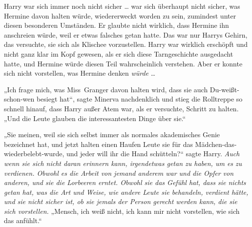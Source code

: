 Harry war sich immer noch nicht sicher … war sich überhaupt nicht sicher, was Hermine davon halten würde, wiedererweckt worden zu sein, zumindest unter diesen besonderen Umständen. Er glaubte nicht wirklich, dass Hermine ihn anschreien würde, weil er etwas falsches getan hatte. Das war nur Harrys Gehirn, das versuchte, sie sich als Klischee vorzustellen. Harry war wirklich erschöpft und nicht ganz klar im Kopf gewesen, als er sich diese Tarngeschichte ausgedacht hatte, und Hermine würde diesen Teil wahrscheinlich verstehen. Aber er konnte sich nicht vorstellen, was Hermine denken \emph{würde} …

„Ich frage mich, was Miss~Granger davon halten wird, dass sie auch Du-weißt-schon-wen besiegt hat“, sagte Minerva nachdenklich und stieg die Rolltreppe so schnell hinauf, dass Harry außer Atem war, als er versuchte, Schritt zu halten.
„Und die Leute glauben die interessantesten Dinge über sie.“

„Sie meinen, weil sie sich selbst immer als normales akademisches Genie bezeichnet hat, und jetzt halten einen Haufen Leute sie für das Mädchen-das-wiederbelebt-wurde, und jeder will ihr die Hand schütteln?“ sagte Harry.
\emph{Auch wenn sie sich nicht daran erinnern kann, irgendetwas getan zu haben, um es zu verdienen. Obwohl es die Arbeit von jemand anderem war und die Opfer von anderen, und sie die Lorbeeren erntet. Obwohl sie das Gefühl hat, dass sie nichts getan hat, was die Art und Weise, wie andere Leute sie behandeln, verdient hätte, und sie nicht sicher ist, ob sie jemals der Person gerecht werden kann, die sie sich vorstellen.}
„Mensch, ich weiß nicht, ich kann mir nicht vorstellen, wie sich das anfühlt.“

